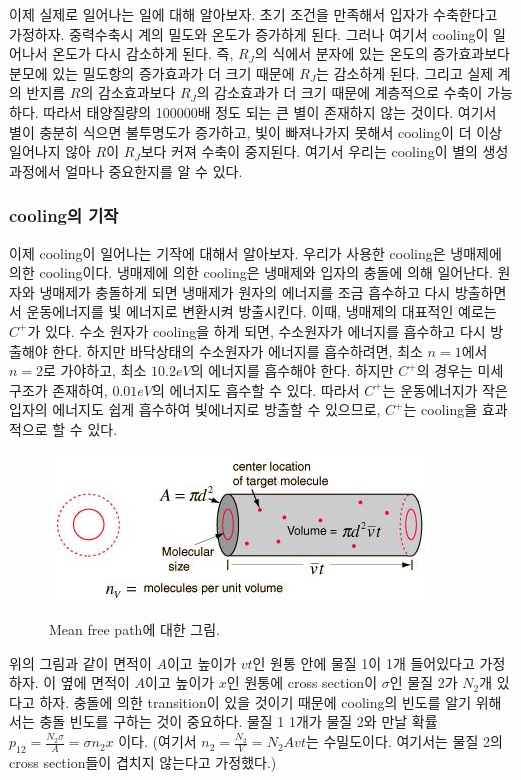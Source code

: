 \documentclass{gshs-hutech}
\begin{document}
이제 실제로 일어나는 일에 대해 알아보자. 초기 조건을 만족해서 입자가 수축한다고 가정하자. 중력수축시 계의 밀도와 온도가 증가하게 된다. 그러나 여기서 cooling이 일어나서 온도가 다시 감소하게 된다. 즉, $R_J$의 식에서 분자에 있는 온도의 증가효과보다 분모에 있는 밀도항의 증가효과가 더 크기 때문에 $R_J$는 감소하게 된다. 그리고 실제 계의 반지름 $R$의 감소효과보다 
$R_J$의 감소효과가 더 크기 때문에 계층적으로 수축이 가능하다. 따라서 태양질량의 100000배 정도 되는 큰 별이 존재하지 않는 것이다. 여기서 별이 충분히 식으면 불투명도가 증가하고, 빛이 빠져나가지 못해서 cooling이 더 이상 일어나지 않아 $R$이 $R_J$보다 커져 수축이 중지된다. 여기서 우리는 cooling이 별의 생성과정에서 얼마나 중요한지를 알 수 있다.
 
\subsubsection{cooling의 기작}

이제 cooling이 일어나는 기작에 대해서 알아보자. 우리가 사용한 cooling은 냉매제에 의한 cooling이다. 냉매제에 의한 cooling은 냉매제와 입자의 충돌에 의해 일어난다. 원자와 냉매제가 충돌하게 되면 냉매제가 원자의 에너지를 조금 흡수하고 다시 방출하면서 운동에너지를 빛 에너지로 변환시켜 방출시킨다. 이때, 냉매제의 대표적인 예로는 $C^+$가 있다. 수소 원자가 cooling을 하게 되면, 수소원자가 에너지를 흡수하고 다시 방출해야 한다. 하지만 바닥상태의 수소원자가 에너지를 흡수하려면, 최소 $n=1$에서 $n=2$로 가야하고, 최소 $10.2eV$의 에너지를 흡수해야 한다. 하지만 $C^+$의 경우는 미세구조가 존재하여, $0.01eV$의 에너지도 흡수할 수 있다. 따라서 $C^+$는 운동에너지가 작은 입자의 에너지도 쉽게 흡수하여 빛에너지로 방출할 수 있으므로, $C^+$는 cooling을 효과적으로 할 수 있다.


\begin{figure}[h]
	\begin{center}
		\includegraphics[scale=0.8]{mean_free_path.jpg}
		
		Mean free path에 대한 그림.
	\end{center}
\end{figure}

위의 그림과 같이 면적이 $A$이고 높이가 $vt$인 원통 안에 물질 1이 1개 들어있다고 가정하자. 이 옆에 면적이 $A$이고 높이가 $x$인 원통에 cross section이 $\sigma$인 물질 2가 $N_2$개 있다고 하자. 충돌에 의한 transition이 있을 것이기 때문에 cooling의 빈도를 알기 위해서는 충돌 빈도를 구하는 것이 중요하다. 물질 1 1개가 물질 2와 만날 확률 $p_{12} = \frac{N_2\sigma}{A}=\sigma n_2x$ 이다. (여기서 $n_2=\frac{N_2}{V}={N_2}{Avt}$는 수밀도이다. 여기서는 물질 2의 cross section들이 겹치지 않는다고 가정했다.)
\end{document}
